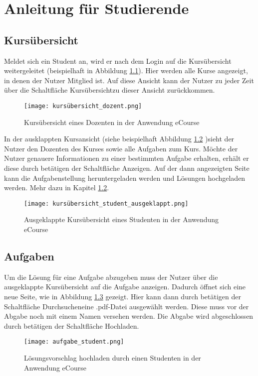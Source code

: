 \chapter{Anleitung für Studierende}
\label{sec:chap3}

\section{Kursübersicht}

Meldet sich ein Student an, wird er nach dem Login auf die Kursübersicht weitergeleitet (beispielhaft in Abbildung \ref{fib:kursübersicht_student}). Hier werden alle Kurse angezeigt, in denen der Nutzer Mitglied ist.
Auf diese Ansicht kann der Nutzer zu jeder Zeit über die Schaltfläche \glqq Kursübersicht\grqq zu dieser Ansicht zurückkommen. 

\begin{figure}[h]
\centering
\texttt{[image: kursübersicht\_dozent.png]}
\caption{Kursübersicht eines Dozenten in der Anwendung eCourse}
\label{fib:kursübersicht_student}
\end{figure}

In der ausklappten Kursansicht (siehe beispielhaft Abbildung \ref{fib:kursübersicht_student_aus} )sieht der Nutzer den Dozenten des Kurses sowie alle Aufgaben zum Kurs. Möchte der Nutzer genauere Informationen zu einer bestimmten Aufgabe erhalten, erhält er diese durch betätigen der Schaltfläche \glqq Anzeigen\grqq. Auf der dann angezeigten Seite kann die Aufgabenstellung heruntergeladen werden und Lösungen hochgeladen werden. Mehr dazu in Kapitel \ref{sec:aufg}.

\begin{figure}[h]
\centering
\texttt{[image: kursübersicht\_student\_ausgeklappt.png]}
\caption{Ausgeklappte Kursübersicht eines Studenten in der Anwendung eCourse}
\label{fib:kursübersicht_student_aus}
\end{figure}

\section{Aufgaben}
\label{sec:aufg}
Um die Lösung für eine Aufgabe abzugeben muss der Nutzer über die ausgeklappte Kursübersicht auf die Aufgabe anzeigen. Dadurch öffnet sich eine neue Seite, wie in Abbildung \ref{fib:hochladen} gezeigt. Hier kann dann durch betätigen der Schaltfläche \glqq Durchsuchen\grqq eine .pdf-Datei ausgewählt werden. Diese muss vor der Abgabe noch mit einem Namen versehen werden. Die Abgabe wird abgeschlossen durch betätigen der Schaltfläche \glqq Hochladen\grqq.
\begin{figure}[h]
\centering
\texttt{[image: aufgabe\_student.png]}
\caption{Lösungsvorschlag hochladen durch einen Studenten in der Anwendung eCourse}
\label{fib:hochladen}
\end{figure}
